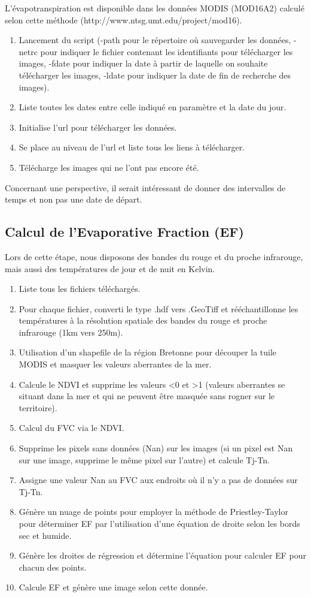 \documentclass[10pt,a4paper]{article}
\begin{document}
L'évapotranspiration est disponible dans les données MODIS (MOD16A2) calculé selon cette méthode (http://www.ntsg.umt.edu/project/mod16).

\begin{enumerate}
\item Lancement du script (-path pour le répertoire où sauvegarder les données, -netrc pour indiquer le fichier contenant les identifiants pour télécharger les images, -fdate pour indiquer la date à partir de laquelle on souhaite télécharger les images, -ldate pour indiquer la date de fin de recherche des images).
\item Liste toutes les dates entre celle indiqué en paramètre et la date du jour.
\item Initialise l'url pour télécharger les données.
\item Se place au niveau de l'url et liste tous les liens à télécharger.
\item Télécharge les images qui ne l'ont pas encore été.
\end{enumerate}

Concernant une perspective, il serait intéressant de donner des intervalles de temps et non pas une date de départ.

\subsection{Calcul de l'Evaporative Fraction (EF)}

Lors de cette étape, nous disposons des bandes du rouge et du proche infrarouge, mais aussi des températures de jour et de nuit en Kelvin.

\begin{enumerate}
\item Liste tous les fichiers téléchargés.
\item  Pour chaque fichier, converti le type .hdf vers .GeoTiff et rééchantillonne les températures à la résolution spatiale des bandes du rouge et proche infrarouge (1km vers 250m).
\item Utilisation d'un shapefile de la région Bretonne pour découper la tuile MODIS et masquer les valeurs aberrantes de la mer.
\item Calcule le NDVI et supprime les valeurs <0 et >1 (valeurs aberrantes se situant dans la mer et qui ne peuvent être masquée sans rogner sur le territoire).
\item Calcul du FVC via le NDVI.
\item Supprime les pixels sans données (Nan) sur les images (si un pixel est Nan sur une image, supprime le même pixel sur l'autre) et calcule Tj-Tn.
\item Assigne une valeur Nan au FVC aux endroits où il n'y a pas de données sur Tj-Tn.
\item Génère un nuage de points pour employer la méthode de Priestley-Taylor pour déterminer EF par l'utilisation d'une équation de droite selon les bords sec et humide.
\item Génère les droites de régression et détermine l'équation pour calculer EF pour chacun des points.
\item Calcule EF et génère une image selon cette donnée.
\end{enumerate}
\end{document}
